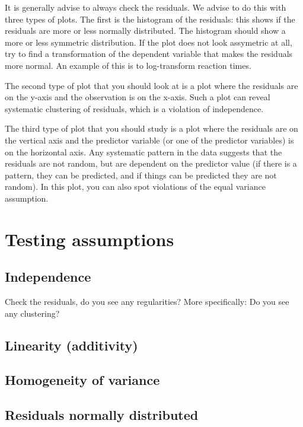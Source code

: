 \documentclass[]{report}\usepackage[]{graphicx}\usepackage[]{color}
\begin{document}
It is generally advise to always check the residuals. We advise to do this with three types of plots. The first is the histogram of the residuals: this shows if the residuals are more or less normally distributed. The histogram should show a more or less symmetric distribution. If the plot does not look assymetric at all, try to find a transformation of the dependent variable that makes the residuals more normal. An example of this is to log-transform reaction times. 

The second type of plot that you should look at is a plot where the residuals are on the y-axis and the observation is on the x-axis. Such a plot can reveal systematic clustering of residuals, which is a violation of independence. 

The third type of plot that you should study is a plot where the residuals are on the vertical axis and the predictor variable (or one of the predictor variables) is on the horizontal axis. Any systematic pattern in the data suggests that the residuals are not random, but are dependent on the predictor value (if there is a pattern, they can be predicted, and if things can be predicted they are not random). In this plot, you can also spot violations of the equal variance assumption. 







\section{Testing assumptions}
\subsection{Independence}

Check the residuals, do you see any regularities? More specifically: Do you see any clustering? 

\subsection{Linearity (additivity)}
\subsection{Homogeneity of variance}
\subsection{Residuals normally distributed}
\end{document}
